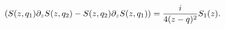 \begin{equation}
 (S(z,q_1)\partial_zS(z,q_2) -
S(z,q_2)\partial_zS(z,q_1) ) = {i \over 4 (z-q)^2} S_1(z) .
\end{equation}

